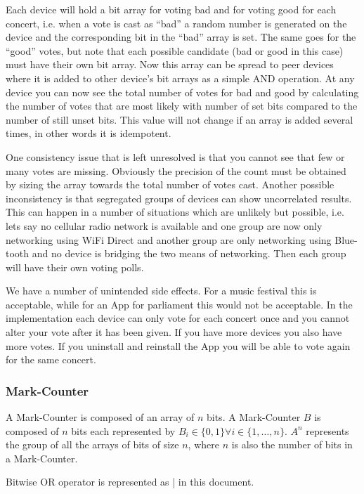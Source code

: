Each device will hold a bit array for voting bad and for voting good for each concert, i.e. when a vote is cast as ``bad'' a random number is generated on the device and the corresponding bit in the ``bad'' array is set. The same goes for the ``good'' votes, but note that each possible candidate (bad or good in this case) must have their own bit array. Now this array can be spread to peer devices where it is added to other device\textquoteright s bit arrays as a simple AND operation. At any device you can now see the total number of votes for bad and good by calculating the number of votes that are most likely with number of set bits compared to the number of still unset bits. This value will not change if an array is added several times, in other words it is idempotent. 

One consistency issue that is left unresolved is that you cannot see that few or many votes are missing. Obviously the precision of the count must be obtained by sizing the array towards the total number of votes cast. Another possible inconsistency is that segregated groups of devices can show uncorrelated results. This can happen in a number of situations which are unlikely but possible, i.e. lets say no cellular radio network is available and one group are now only networking using WiFi Direct and another group are only networking using Blue-tooth and no device is bridging the two means of networking. Then each group will have their own voting polls.

We have a number of unintended side effects. For a music festival this is acceptable, while for an App for parliament this would not be acceptable. In the implementation each device can only vote for each concert once and you cannot alter your vote after it has been given. If you have more devices you also have more votes. If you uninstall and reinstall the App you will be able to vote again for the same concert.

\subsubsection{Mark-Counter}
A Mark-Counter is composed of an array of $n$ bits. A Mark-Counter $B$ is composed of $n$ bits each represented by $B_{i} \in \{0, 1\} \forall i \in \{1,\dots, n\}$. $A^{n}$ represents the group of all the arrays of bits of size $n$, where $n$ is also the number of bits in a Mark-Counter.

Bitwise OR operator is represented as | in this document.

